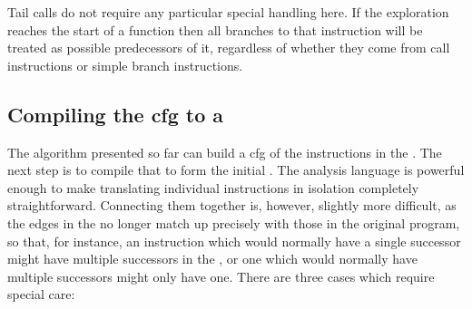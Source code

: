 
Tail calls do not require any particular special handling here.  If
the exploration reaches the start of a function then all branches to
that instruction will be treated as possible predecessors of it,
regardless of whether they come from call instructions or simple
branch instructions.

\subsection[Compiling the \glsentrytext{cfg} to a \StateMachine]{Compiling the \gls{cfg} to a \StateMachine}
\label{sect:derive:compile_cfg}


The algorithm presented so far can build a \gls{cfg} of the
instructions in the .  The next step is to
compile that  to form the initial {\StateMachine}.  The
{\StateMachine} analysis language is powerful enough to make
translating individual instructions in isolation completely
straightforward.  Connecting them together is, however, slightly more
difficult, as the edges in the  no longer match up
precisely with those in the original program, so that, for instance,
an instruction which would normally have a single successor might have
multiple successors in the , or one which would normally
have multiple successors might only have one.  There are three cases
which require special care:

